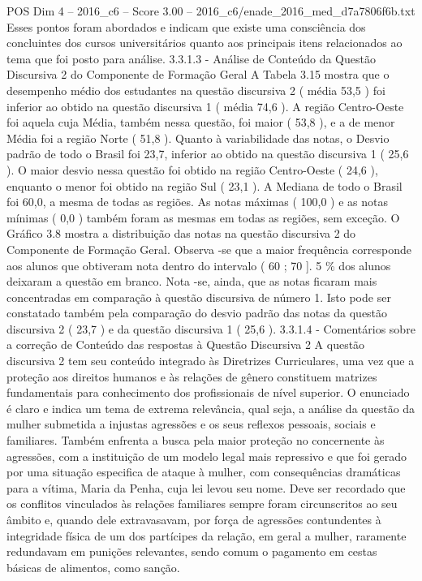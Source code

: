 \begin{textsample}{POS Dim 4 – 2016\_c6 – Score 3.00 – 2016\_c6/enade\_2016\_med\_d7a7806f6b.txt}
Esses pontos foram abordados e indicam que existe uma consciência dos concluintes dos cursos universitários quanto aos principais itens relacionados ao tema que foi posto para análise. 3.3.1.3 - Análise de Conteúdo da Questão Discursiva 2 do Componente de Formação Geral A Tabela 3.15 mostra que o desempenho médio dos estudantes na questão discursiva 2 ( média 53,5 ) foi inferior ao obtido na questão discursiva 1 ( média 74,6 ).
A região Centro-Oeste foi aquela cuja Média, também nessa questão, foi maior ( 53,8 ), e a de menor Média foi a região Norte ( 51,8 ).
Quanto à variabilidade das notas, o Desvio padrão de todo o Brasil foi 23,7, inferior ao obtido na questão discursiva 1 ( 25,6 ).
O maior desvio nessa questão foi obtido na região Centro-Oeste ( 24,6 ), enquanto o menor foi obtido na região Sul ( 23,1 ).
A Mediana de todo o Brasil foi 60,0, a mesma de todas as regiões.
As notas máximas ( 100,0 ) e as notas mínimas ( 0,0 ) também foram as mesmas em todas as regiões, sem exceção.
O Gráfico 3.8 mostra a distribuição das notas na questão discursiva 2 do Componente de Formação Geral.
Observa -se que a maior frequência corresponde aos alunos que obtiveram nota dentro do intervalo ( 60 ; 70 ]. 5 \% dos alunos deixaram a questão em branco.
Nota -se, ainda, que as notas ficaram mais concentradas em comparação à questão discursiva de número 1.
Isto pode ser constatado também pela comparação do desvio padrão das notas da questão discursiva 2 ( 23,7 ) e da questão discursiva 1 ( 25,6 ). 3.3.1.4 - Comentários sobre a correção de Conteúdo das respostas à Questão Discursiva 2 A questão discursiva 2 tem seu conteúdo integrado às Diretrizes Curriculares, uma vez que a proteção aos direitos humanos e às relações de gênero constituem matrizes fundamentais para conhecimento dos profissionais de nível superior.
O enunciado é claro e indica um tema de extrema relevância, qual seja, a análise da questão da mulher submetida a injustas agressões e os seus reflexos pessoais, sociais e familiares.
Também enfrenta a busca pela maior proteção no concernente às agressões, com a instituição de um modelo legal mais repressivo e que foi gerado por uma situação especifica de ataque à mulher, com consequências dramáticas para a vítima, Maria da Penha, cuja lei levou seu nome.
Deve ser recordado que os conflitos vinculados às relações familiares sempre foram circunscritos ao seu âmbito e, quando dele extravasavam, por força de agressões contundentes à integridade física de um dos partícipes da relação, em geral a mulher, raramente redundavam em punições relevantes, sendo comum o pagamento em cestas básicas de alimentos, como sanção.

\end{textsample}
